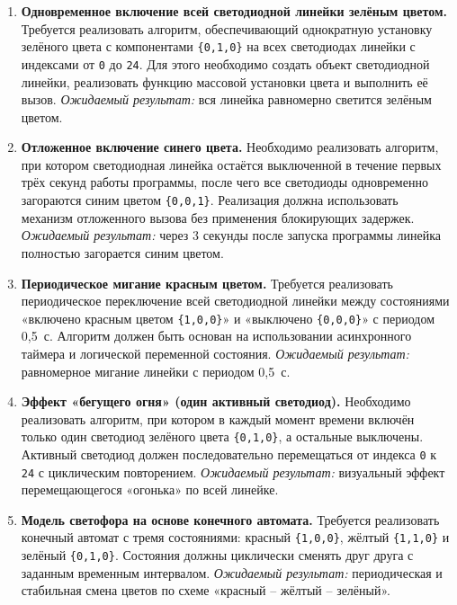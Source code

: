 \begin{enumerate}
  \item \textbf{Одновременное включение всей светодиодной линейки зелёным цветом.}  
  Требуется реализовать алгоритм, обеспечивающий однократную установку зелёного цвета с компонентами \verb|{0,1,0}| на всех светодиодах линейки с индексами от \verb|0| до \verb|24|. Для этого необходимо создать объект светодиодной линейки, реализовать функцию массовой установки цвета и выполнить её вызов.  
  \textit{Ожидаемый результат:} вся линейка равномерно светится зелёным цветом.

  \item \textbf{Отложенное включение синего цвета.}  
  Необходимо реализовать алгоритм, при котором светодиодная линейка остаётся выключенной в течение первых трёх секунд работы программы, после чего все светодиоды одновременно загораются синим цветом \verb|{0,0,1}|. Реализация должна использовать механизм отложенного вызова без применения блокирующих задержек.  
  \textit{Ожидаемый результат:} через 3 секунды после запуска программы линейка полностью загорается синим цветом.

  \item \textbf{Периодическое мигание красным цветом.}  
  Требуется реализовать периодическое переключение всей светодиодной линейки между состояниями «включено красным цветом \verb|{1,0,0}|» и «выключено \verb|{0,0,0}|» с периодом 0{,}5~с. Алгоритм должен быть основан на использовании асинхронного таймера и логической переменной состояния.  
  \textit{Ожидаемый результат:} равномерное мигание линейки с периодом 0{,}5~с.

  \item \textbf{Эффект «бегущего огня» (один активный светодиод).}  
  Необходимо реализовать алгоритм, при котором в каждый момент времени включён только один светодиод зелёного цвета \verb|{0,1,0}|, а остальные выключены. Активный светодиод должен последовательно перемещаться от индекса \verb|0| к \verb|24| с циклическим повторением.  
  \textit{Ожидаемый результат:} визуальный эффект перемещающегося «огонька» по всей линейке.

  \item \textbf{Модель светофора на основе конечного автомата.}  
  Требуется реализовать конечный автомат с тремя состояниями: красный \verb|{1,0,0}|, жёлтый \verb|{1,1,0}| и зелёный \verb|{0,1,0}|. Состояния должны циклически сменять друг друга с заданным временным интервалом.  
  \textit{Ожидаемый результат:} периодическая и стабильная смена цветов по схеме «красный -- жёлтый -- зелёный».
\end{enumerate}

